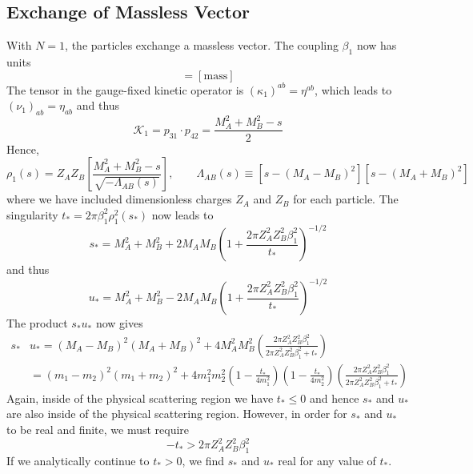 \subsection{Exchange of Massless Vector}
With $N = 1$, the particles exchange a massless vector. The coupling $\beta_{1}$ now has units
\begin{equation}
	[\beta_{1}] = [\text{mass}]
\end{equation}
The tensor in the gauge-fixed kinetic operator is $(\kappa_{1})^{ab} = \eta^{ab}$, which leads to $(\nu_{1})_{ab} = \eta_{ab}$ and thus
\begin{equation}
	\mathcal{K}_{1} = p_{31} \cdot p_{42} = \frac{M_{A}^{2} + M_{B}^{2} - s}{2}
\end{equation}
Hence,
\begin{equation}
	\rho_{1}(s) = Z_{A} Z_{B} \left[ \frac{M_{A}^{2} + M_{B}^{2} - s}{\sqrt{-\Lambda_{AB}(s)}} \right], \qquad \Lambda_{AB}(s) \equiv [s - (M_{A} - M_{B})^{2}] [s - (M_{A} + M_{B})^{2}]
\end{equation}
where we have included dimensionless charges $Z_{A}$ and $Z_{B}$ for each particle. The singularity $t_{*} = 2 \pi \beta_{1}^{2} \rho_{1}^{2}(s_{*})$ now leads to
\begin{equation}
	s_{*} = M_{A}^{2} + M_{B}^{2} + 2 M_{A} M_{B} \left(1 + \frac{2 \pi Z_{A}^{2} Z_{B}^{2} \beta_{1}^{2}}{t_{*}} \right)^{-1/2}
\end{equation}
and thus
\begin{equation}
	u_{*} = M_{A}^{2} + M_{B}^{2} - 2 M_{A} M_{B} \left(1 + \frac{2 \pi Z_{A}^{2} Z_{B}^{2} \beta_{1}^{2}}{t_{*}} \right)^{-1/2}
\end{equation}
The product $s_{*} u_{*}$ now gives
\begin{align}
	s_{*}& u_{*} = (M_{A} - M_{B})^{2}(M_{A} + M_{B})^{2} + 4 M_{A}^{2} M_{B}^{2} \left( \frac{2 \pi Z_{A}^{2} Z_{B}^{2} \beta_{1}^{2}}{2 \pi Z_{A}^{2} Z_{B}^{2} \beta_{1}^{2} + t_{*}} \right) \nonumber \\
	&= (m_{1} - m_{2})^{2}(m_{1} + m_{2})^{2} + 4 m_{1}^{2} m_{2}^{2} \left(1 - \frac{t_{*}}{4 m_{1}^{2}} \right) \left(1 - \frac{t_{*}}{4 m_{2}^{2}} \right) \left( \frac{2 \pi Z_{A}^{2} Z_{B}^{2} \beta_{1}^{2}}{2 \pi Z_{A}^{2} Z_{B}^{2} \beta_{1}^{2} + t_{*}} \right)
\end{align}
Again, inside of the physical scattering region we have $t_{*} \leq 0$ and hence $s_{*}$ and $u_{*}$ are also inside of the physical scattering region. However, in order for $s_{*}$ and $u_{*}$ to be real and finite, we must require
\begin{equation}
	{-t_{*}} > 2 \pi Z_{A}^{2} Z_{B}^{2} \beta_{1}^{2}
\end{equation}
If we analytically continue to $t_{*} > 0$, we find $s_{*}$ and $u_{*}$ real for any value of $t_{*}$.

